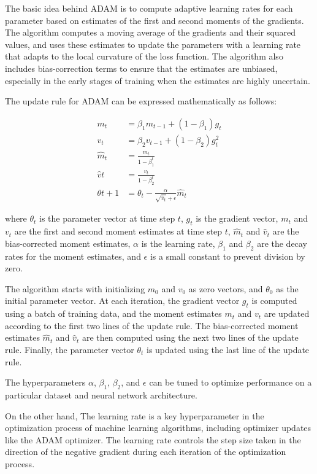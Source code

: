 The basic idea behind ADAM is to compute adaptive learning rates for each parameter based on estimates of the first and second moments of the gradients. The algorithm computes a moving average of the gradients and their squared values, and uses these estimates to update the parameters with a learning rate that adapts to the local curvature of the loss function. The algorithm also includes bias-correction terms to ensure that the estimates are unbiased, especially in the early stages of training when the estimates are highly uncertain.

The update rule for ADAM can be expressed mathematically as follows:

\begin{equation}
\begin{split}
	m_t &= \beta_1 m_{t-1} + (1-\beta_1) g_t \\
	v_t &= \beta_2 v_{t-1} + (1-\beta_2) g_t^2 \\
	\hat{m}_t &= \frac{m_t}{1-\beta_1^t} \\
	\hat{v}t &= \frac{v_t}{1-\beta_2^t} \\
	\theta{t+1} &= \theta_t - \frac{\alpha}{\sqrt{\hat{v}_t}+\epsilon} \hat{m}_t
\end{split}
\end{equation}

where $\theta_t$ is the parameter vector at time step $t$, $g_t$ is the gradient vector, $m_t$ and $v_t$ are the first and second moment estimates at time step $t$, $\hat{m}_t$ and $\hat{v}_t$ are the bias-corrected moment estimates, $\alpha$ is the learning rate, $\beta_1$ and $\beta_2$ are the decay rates for the moment estimates, and $\epsilon$ is a small constant to prevent division by zero.

The algorithm starts with initializing $m_0$ and $v_0$ as zero vectors, and $\theta_0$ as the initial parameter vector. At each iteration, the gradient vector $g_t$ is computed using a batch of training data, and the moment estimates $m_t$ and $v_t$ are updated according to the first two lines of the update rule. The bias-corrected moment estimates $\hat{m}_t$ and $\hat{v}_t$ are then computed using the next two lines of the update rule. Finally, the parameter vector $\theta_t$ is updated using the last line of the update rule.

The hyperparameters $\alpha$, $\beta_1$, $\beta_2$, and $\epsilon$ can be tuned to optimize performance on a particular dataset and neural network architecture.

On the other hand, The learning rate is a key hyperparameter in the optimization process of machine learning algorithms, including optimizer updates like the ADAM optimizer. The learning rate controls the step size taken in the direction of the negative gradient during each iteration of the optimization process.

